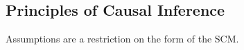 




\subsection{Principles of Causal Inference}
\label{sec:back:prin}

Assumptions are a restriction on the form of the SCM.



\label{sec:back:meth}